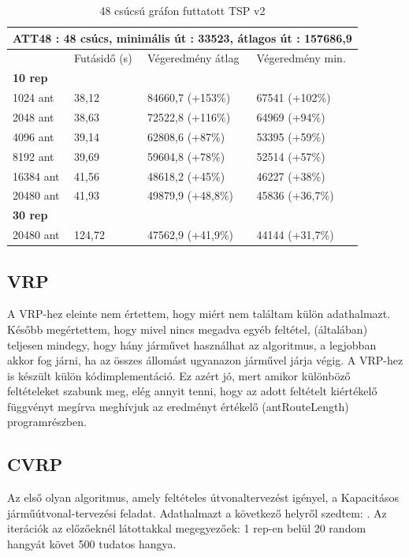 \begin{table}[htbp!]
	\centering
	\begin{tabular}{|p{2cm}||p{3cm}|p{3.5cm}|p{3.5cm}|}
		\hline
		\multicolumn{4}{|c|}{ATT48 : 48 csúcs, minimális út : 33523, átlagos út : 157686,9} \\
		\hline
		& Futásidő (s) & Végeredmény átlag & Végeredmény min.\\
		\hline
		\textbf{10 rep} & & & \\
		1024 ant & 38,12 & 84660,7 (+153\%) & 67541 (+102\%) \\
		2048 ant & 38,63 & 72522,8 (+116\%) & 64969 (+94\%) \\
		4096 ant & 39,14 & 62808,6 (+87\%) & 53395 (+59\%) \\
		8192 ant & 39,69 & 59604,8 (+78\%) & 52514 (+57\%) \\
		16384 ant & 41,56 & 48618,2 (+45\%) & 46227 (+38\%)\\
		20480 ant & 41,93 & 49879,9 (+48,8\%) & 45836 (+36,7\%)\\
		\hline
		\textbf{30 rep} & & & \\
		20480 ant & 124,72 & 47562,9 (+41,9\%) & 44144 (+31,7\%) \\
		\hline
	\end{tabular}
	\caption{48 csúcsú gráfon futtatott TSP v2}
	\label{table:TSPv2_48}
\end{table}

\newpage

\subsection{VRP}
A VRP-hez eleinte nem értettem, hogy miért nem találtam külön adathalmazt. Később megértettem, hogy mivel nincs megadva egyéb feltétel, (általában) teljesen mindegy, hogy hány járművet használhat az algoritmus, a legjobban akkor fog járni, ha az összes állomást ugyanazon járművel járja végig. A VRP-hez is készült külön kódimplementáció. Ez azért jó, mert amikor különböző feltételeket szabunk meg, elég annyit tenni, hogy az adott feltételt kiértékelő függvényt megírva meghívjuk az eredményt értékelő (antRouteLength) programrészben.


\subsection{CVRP}
Az első olyan algoritmus, amely feltételes útvonaltervezést igényel, a Kapacitásos járműútvonal-tervezési feladat. Adathalmazt a következő helyről szedtem: \cite{CVRPdataset}.
Az iterációk az előzőeknél látottakkal megegyezőek: 1 rep-en belül 20 random hangyát követ 500 tudatos hangya.

